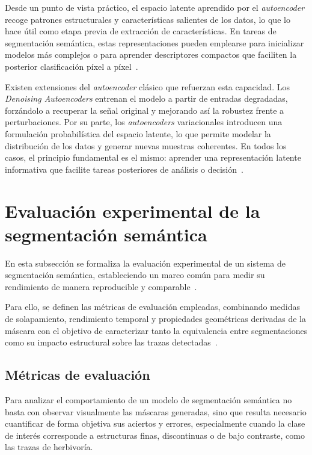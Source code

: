 Desde un punto de vista práctico, el espacio latente aprendido por el \textit{autoencoder} recoge patrones estructurales y características salientes de los datos, lo que lo hace útil como etapa previa de extracción de características. En tareas de segmentación semántica, estas representaciones pueden emplearse para inicializar modelos más complejos o para aprender descriptores compactos que faciliten la posterior clasificación píxel a píxel~\cite{Goodfellow-et-al-2016}.

Existen extensiones del \textit{autoencoder} clásico que refuerzan esta capacidad. Los \textit{Denoising Autoencoders} entrenan el modelo a partir de entradas degradadas, forzándolo a recuperar la señal original y mejorando así la robustez frente a perturbaciones. Por su parte, los \textit{autoencoders} variacionales introducen una formulación probabilística del espacio latente, lo que permite modelar la distribución de los datos y generar nuevas muestras coherentes. En todos los casos, el principio fundamental es el mismo: aprender una representación latente informativa que facilite tareas posteriores de análisis o decisión~\cite{neloy2024autoencoders, iana2024peeling}.

\section{Evaluación experimental de la segmentación semántica}
En esta subsección se formaliza la evaluación experimental de un sistema de segmentación semántica, estableciendo un marco común para medir su rendimiento de manera reproducible y comparable~\cite{minaee2022segmentationSurvey,TahaHanbury2015}.

Para ello, se definen las métricas de evaluación empleadas, combinando medidas de solapamiento, rendimiento temporal y propiedades geométricas derivadas de la máscara con el objetivo de caracterizar tanto la equivalencia entre segmentaciones como su impacto estructural sobre las trazas detectadas~\cite{gonzalez2008dip,zhang1984thinning}.

\subsection{Métricas de evaluación}

Para analizar el comportamiento de un modelo de segmentación semántica no basta con observar visualmente las máscaras generadas, sino que resulta necesario cuantificar de forma objetiva sus aciertos y errores, especialmente cuando la clase de interés corresponde a estructuras finas, discontinuas o de bajo contraste, como las trazas de herbivoría. 

